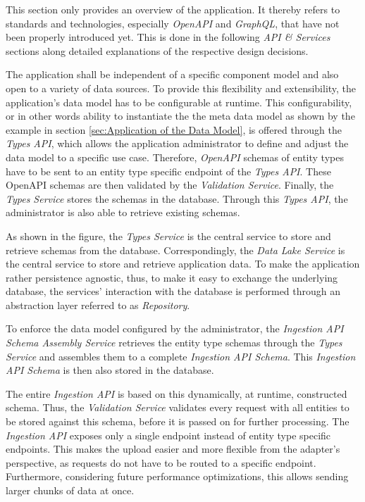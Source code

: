 This section only provides an overview of the application. It thereby refers to standards and technologies, especially \emph{OpenAPI} and \emph{GraphQL}, that have not been properly introduced yet. This is done in the following \emph{API \& Services} sections along detailed explanations of the respective design decisions.\par
The application shall be independent of a specific component model and also open to a variety of data sources. To provide this flexibility and extensibility, the application's data model has to be configurable at runtime. This configurability, or in other words ability to instantiate the the meta data model as shown by the example in section \ref{sec:Application of the Data Model}, is offered through the \emph{Types API}, which allows the application administrator to define and adjust the data model to a specific use case. Therefore, \emph{OpenAPI} schemas of entity types have to be sent to an entity type specific endpoint of the \emph{Types API}. These OpenAPI schemas are then validated by the \emph{Validation Service}. Finally, the \emph{Types Service} stores the schemas in the database. Through this \emph{Types API}, the administrator is also able to retrieve existing schemas.\par
As shown in the figure, the \emph{Types Service} is the central service to store and retrieve schemas from the database. Correspondingly, the \emph{Data Lake Service} is the central service to store and retrieve application data. To make the application rather persistence agnostic, thus, to make it easy to exchange the underlying database, the services' interaction with the database is performed through an abstraction layer referred to as \emph{Repository}.\par 
To enforce the data model configured by the administrator, the \emph{Ingestion API Schema Assembly Service} retrieves the entity type schemas through the \emph{Types Service} and assembles them to a complete \emph{Ingestion API Schema}. This \emph{Ingestion API Schema} is then also stored in the database.\par
The entire \emph{Ingestion API} is based on this dynamically, at runtime, constructed schema. Thus, the \emph{Validation Service} validates every request with all entities to be stored against this schema, before it is passed on for further processing. The \emph{Ingestion API} exposes only a single endpoint instead of entity type specific endpoints. This makes the upload easier and more flexible from the adapter's perspective, as requests do not have to be routed to a specific endpoint. Furthermore, considering future performance optimizations, this allows sending larger chunks of data at once.\par
